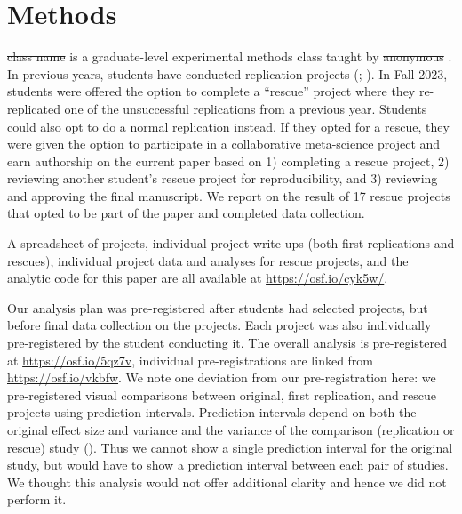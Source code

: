 \documentclass[
  english,
  a4paper,
]{article}
\providecommand{\DIFaddtex}[1]{{\protect\color{blue}\uwave{#1}}} %
\providecommand{\DIFdeltex}[1]{{\protect\color{red}\sout{#1}}}                      %
\providecommand{\DIFaddbegin}{} %
\providecommand{\DIFaddend}{} %
\providecommand{\DIFdelbegin}{} %
\providecommand{\DIFdelend}{} %
\providecommand{\DIFadd}[1]{\texorpdfstring{\DIFaddtex{#1}}{#1}} %
\providecommand{\DIFdel}[1]{\texorpdfstring{\DIFdeltex{#1}}{}} %
\newcommand{\DIFscaledelfig}{0.5}
\newlength{\DIFdelgraphicswidth} %
\newlength{\DIFdelgraphicsheight} %
\newcommand{\DIFaddincludegraphics}[2][]{{\color{blue}\fbox{\DIFOincludegraphics[#1]{#2}}}} %
\newcommand{\DIFdelincludegraphics}[2][]{%
\sbox{\DIFdelgraphicsbox}{\DIFOincludegraphics[#1]{#2}}%
\settoboxwidth{\DIFdelgraphicswidth}{\DIFdelgraphicsbox} %
\settoboxtotalheight{\DIFdelgraphicsheight}{\DIFdelgraphicsbox} %
\scalebox{\DIFscaledelfig}{%
\parbox[b]{\DIFdelgraphicswidth}{\usebox{\DIFdelgraphicsbox}\\[-\baselineskip] \rule{\DIFdelgraphicswidth}{0em}}\llap{\resizebox{\DIFdelgraphicswidth}{\DIFdelgraphicsheight}{%
\setlength{\unitlength}{\DIFdelgraphicswidth}%
\begin{picture}(1,1)%
\thicklines\linethickness{2pt} %
{\color[rgb]{1,0,0}\put(0,0){\framebox(1,1){}}}%
{\color[rgb]{1,0,0}\put(0,0){\line( 1,1){1}}}%
{\color[rgb]{1,0,0}\put(0,1){\line(1,-1){1}}}%
\end{picture}%
}\hspace*{3pt}}} %
} %
\DeclareRobustCommand{\DIFaddbegin}{\DIFOaddbegin \let\includegraphics\DIFaddincludegraphics} %
\DeclareRobustCommand{\DIFaddend}{\DIFOaddend \let\includegraphics\DIFOincludegraphics} %
\DeclareRobustCommand{\DIFdelbegin}{\DIFOdelbegin \let\includegraphics\DIFdelincludegraphics} %
\DeclareRobustCommand{\DIFdelend}{\DIFOaddend \let\includegraphics\DIFOincludegraphics} %
\begin{document}
\section{Methods}\label{methods}

\DIFdelbegin %
\DIFdel{class name}%
\DIFdelend \DIFaddbegin \DIFadd{PSYCH 251 }\DIFaddend is a graduate-level experimental methods class taught by \DIFdelbegin %
\DIFdel{anonymous}%
\DIFdelend \DIFaddbegin \DIFadd{MCF}\DIFaddend .
In previous years, students have conducted replication projects (; ).
In Fall 2023, students were offered the option to complete a ``rescue'' project where they re-replicated one of the unsuccessful replications from a previous year.
Students could also opt to do a normal replication instead.
If they opted for a rescue, they were given the option to participate in a collaborative meta-science project and earn authorship on the current paper based on 1) completing a rescue project, 2) reviewing another student's rescue project for reproducibility, and 3) reviewing and approving the final manuscript.
We report on the result of 17 rescue projects that opted to be part of the paper and completed data collection.

A spreadsheet of projects, individual project write-ups (both first replications and rescues), individual project data and analyses for rescue projects, and the analytic code for this paper are all available at \DIFdelbegin %
\DIFdelend \DIFaddbegin \url{https://osf.io/cyk5w/}\DIFaddend .

Our analysis plan was pre-registered after students had selected projects, but before final data collection on the projects.
Each project was also individually pre-registered by the student conducting it.
The overall analysis is pre-registered at \url{https://osf.io/5qz7v}, individual pre-registrations are linked from \url{https://osf.io/vkbfw}.
We note one deviation from our pre-registration here: we pre-registered visual comparisons between original, first replication, and rescue projects using prediction intervals.
Prediction intervals depend on both the original effect size and variance and the variance of the comparison (replication or rescue) study ().
Thus we cannot show a single prediction interval for the original study, but would have to show a prediction interval between each pair of studies. We thought this analysis would not offer additional clarity and hence we did not perform it.
\end{document}
